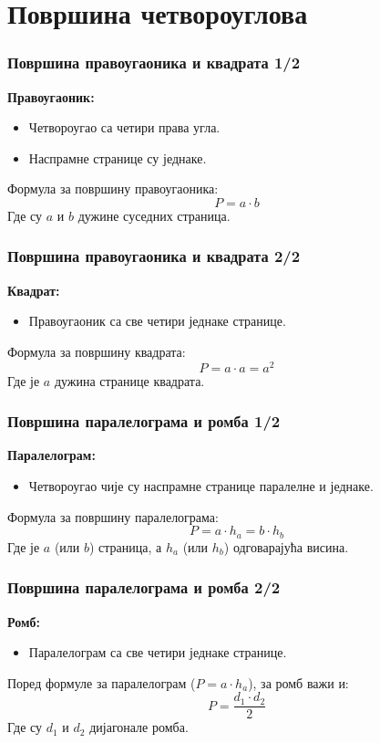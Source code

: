 \documentclass{beamer}
\begin{document}
\section{Површина четвороуглова}

\begin{frame}
\frametitle{Површина правоугаоника и квадрата 1/2}
\textbf{Правоугаоник:}
\begin{itemize}
    \item Четвороугао са четири права угла.
    \item Наспрамне странице су једнаке.
\end{itemize}
Формула за површину правоугаоника:
$$P = a \cdot b$$
Где су $a$ и $b$ дужине суседних страница.
\end{frame}

\begin{frame}
\frametitle{Површина правоугаоника и квадрата 2/2}
\textbf{Квадрат:}
\begin{itemize}
    \item Правоугаоник са све четири једнаке странице.
\end{itemize}
Формула за површину квадрата:
$$P = a \cdot a = a^2$$
Где је $a$ дужина странице квадрата.
\end{frame}

\begin{frame}
\frametitle{Површина паралелограма и ромба 1/2}
\textbf{Паралелограм:}
\begin{itemize}
    \item Четвороугао чије су наспрамне странице паралелне и једнаке.
\end{itemize}
Формула за површину паралелограма:
$$P = a \cdot h_a = b \cdot h_b$$
Где је $a$ (или $b$) страница, а $h_a$ (или $h_b$) одговарајућа висина.
\begin{figure}
    \centering
\end{figure}
\end{frame}

\begin{frame}
\frametitle{Површина паралелограма и ромба 2/2}
\textbf{Ромб:}
\begin{itemize}
    \item Паралелограм са све четири једнаке странице.
\end{itemize}
Поред формуле за паралелограм ($P = a \cdot h_a$), за ромб важи и:
$$P = \frac{d_1 \cdot d_2}{2}$$
Где су $d_1$ и $d_2$ дијагонале ромба.
\end{frame}
\end{document}
